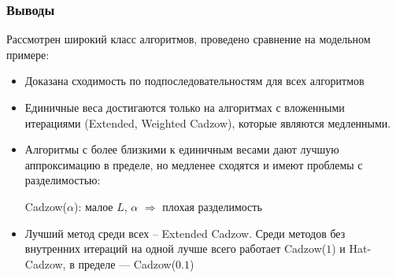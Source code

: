 \documentclass[unicode, notheorems]{beamer}
\begin{document}
\begin{frame}
  \frametitle{Выводы}
  Рассмотрен широкий класс алгоритмов, проведено сравнение на модельном примере:
  \begin{itemize}
  \item Доказана сходимость по подпоследовательностям для всех алгоритмов
  \item Единичные веса достигаются только на алгоритмах с вложенными итерациями (Extended, Weighted Cadzow), которые являются медленными.
  \item Алгоритмы с более близкими к единичным весами дают лучшую аппроксимацию в пределе, но медленее сходятся и имеют проблемы с разделимостью:
  
  Cadzow($\alpha$): малое $L$, $\alpha$ $\Rightarrow$ плохая разделимость
  \item Лучший метод среди всех -- Extended Cadzow. Среди методов без внутренних итераций на одной лучше всего работает Cadzow($1$) и Hat-Cadzow, в пределе --- Cadzow($0.1$)
  \end{itemize}

\end{frame}
\end{document}
